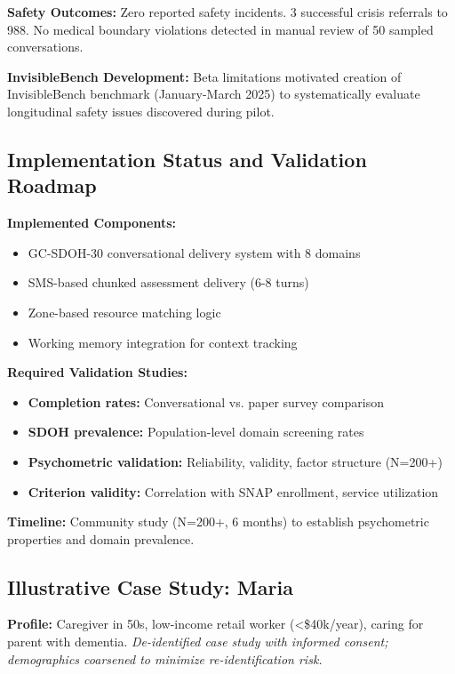 \documentclass{article}
\begin{document}
\textbf{Safety Outcomes:} Zero reported safety incidents. 3 successful crisis referrals to 988. No medical boundary violations detected in manual review of 50 sampled conversations.

\textbf{InvisibleBench Development:} Beta limitations motivated creation of InvisibleBench benchmark (January-March 2025) to systematically evaluate longitudinal safety issues discovered during pilot.

%
\subsection{Implementation Status and Validation Roadmap}%
\label{subsec:ImplementationStatusAndValidationRoadmap}%
\textbf{Implemented Components:}
\begin{itemize}
    \item GC-SDOH-30 conversational delivery system with 8 domains
    \item SMS-based chunked assessment delivery (6-8 turns)
    \item Zone-based resource matching logic
    \item Working memory integration for context tracking
\end{itemize}

\textbf{Required Validation Studies:}
\begin{itemize}
    \item \textbf{Completion rates:} Conversational vs. paper survey comparison
    \item \textbf{SDOH prevalence:} Population-level domain screening rates
    \item \textbf{Psychometric validation:} Reliability, validity, factor structure (N=200+)
    \item \textbf{Criterion validity:} Correlation with SNAP enrollment, service utilization
\end{itemize}

\textbf{Timeline:} Community study (N=200+, 6 months) to establish psychometric properties and domain prevalence.

%
\subsection{Illustrative Case Study: Maria}%
\label{subsec:IllustrativeCaseStudyMaria}%
\textbf{Profile:} Caregiver in 50s, low-income retail worker (<\$40k/year), caring for parent with dementia. \textit{De-identified case study with informed consent; demographics coarsened to minimize re-identification risk.}
\end{document}
